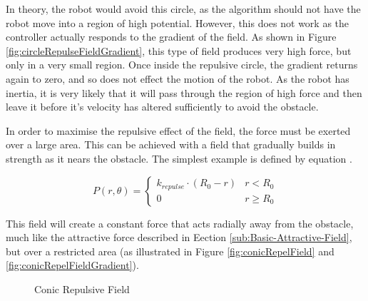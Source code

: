 \documentclass[10pt]{article}
\begin{document}
In theory, the robot would avoid this circle, as the algorithm should not have
the robot move into a region of high potential. However, this does not work as
the controller actually responds to the gradient of the field. As shown in
Figure \ref{fig:circleRepulseFieldGradient}, this type of field produces very
high force, but only in a very small region. Once inside the repulsive circle, the
gradient returns again to zero, and so does not effect the motion of the robot.
As the robot has inertia, it is very likely that it will pass through the region
of high force and then leave it before it's velocity has altered sufficiently to
avoid the obstacle.

In order to maximise the repulsive effect of the field, the force must be
exerted over a large area. This can be achieved with a field that gradually
builds in strength as it nears the obstacle. The simplest example is defined by
equation .

\[
P\left(r,\theta\right)=\begin{cases}
k_{repulse}\cdot \left(R_{0} - r\right) & r<R_{0}\\
0 & r\geq R_{0}
\end{cases}
\]

This field will create a constant force that acts radially away from the
obstacle, much like the attractive force described in Eection
\ref{sub:Basic-Attractive-Field}, but over a restricted area (as illustrated in
Figure \ref{fig:conicRepelField} and \ref{fig:conicRepelFieldGradient}). 

\begin{figure}
 \centering
 \caption{Conic Repulsive Field}
\end{figure}
\end{document}
